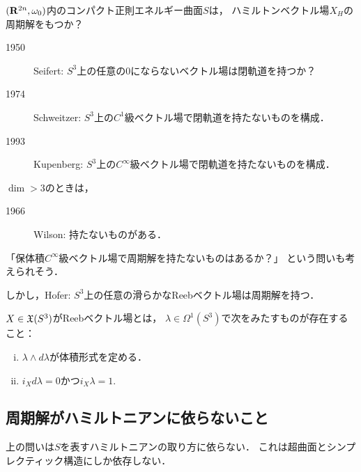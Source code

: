 \begin{Qn*}
    \((\mathbf{R}^{2n},\omega_{0})\)内のコンパクト正則エネルギー曲面\(S\)は，
    ハミルトンベクトル場\(X_H\)の周期解をもつか？
\end{Qn*}

\begin{description}
    \item[1950] Seifert: \(S^3\)上の任意の0にならないベクトル場は閉軌道を持つか？
    \item[1974] Schweitzer: \(S^3\)上の\(C^1\)級ベクトル場で閉軌道を持たないものを構成．
    \item[1993] Kupenberg: \(S^3\)上の\(C^\infty\)級ベクトル場で閉軌道を持たないものを構成．
\end{description}

\(\dim>3\)のときは，
\begin{description}
    \item[1966] Wilson: 持たないものがある．
\end{description}

「保体積\(C^\infty\)級ベクトル場で周期解を持たないものはあるか？」
という問いも考えられそう．

しかし，Hofer: \(S^3\)上の任意の滑らかなReebベクトル場は周期解を持つ．

\begin{DFN}
    \(X\in\mathfrak{X}(S^3)\)がReebベクトル場とは，
    \(\lambda\in\Omega^1(S^3)\)で次をみたすものが存在すること：
    \begin{enumerate}[(i)]
        \item \(\lambda\wedge d\lambda\)が体積形式を定める．
        \item \(i_{X}d\lambda=0\)かつ\(i_{X}\lambda=1.\)
    \end{enumerate}
\end{DFN}

\subsection*{周期解がハミルトニアンに依らないこと}

上の問いは\(S\)を表すハミルトニアンの取り方に依らない．
これは超曲面とシンプレクティック構造にしか依存しない．


